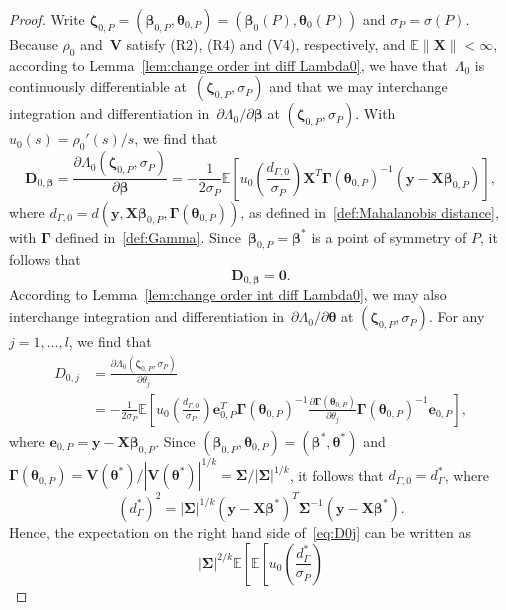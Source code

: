 \documentclass{article}
\numberwithin{equation}{section}
\theoremstyle{plain}
\newcommand{\bbeta}{\bm\beta}
\newcommand{\btheta}{\bm\theta}
\newcommand{\bSigma}{\mathbf{\Sigma}}
\newcommand{\bGamma}{\bm\Gamma}
\newcommand{\bzeta}{\bm\zeta}
\newcommand{\by}{\mathbf{y}}
\newcommand{\be}{\mathbf{e}}
\newcommand{\bX}{\mathbf{X}}
\newcommand{\bV}{\mathbf{V}}
\newcommand{\bD}{\mathbf{D}}
\newcommand{\E}{\mathbb{E}}
\begin{document}
\begin{proof}
Write $\bzeta_{0,P}=(\bbeta_{0,P},\btheta_{0,P})=(\bbeta_0(P),\btheta_0(P))$ and $\sigma_P=\sigma(P)$.
Because $\rho_0$ and~$\bV$ satisfy (R2), (R4) and (V4), respectively, and $\E\|\bX\|<\infty$,
according to Lemma~\ref{lem:change order int diff Lambda0},
we have that~$\Lambda_0$ is continuously differentiable at~$(\bzeta_{0,P},\sigma_P)$
and that we may interchange integration and differentiation in~$\partial\Lambda_0/\partial\bbeta$
at $(\bzeta_{0,P},\sigma_P)$.
With~$u_0(s)=\rho_0'(s)/s$, we find that
\[
\bD_{0,\bbeta}
=
\frac{\partial\Lambda_0(\bzeta_{0,P},\sigma_P)}{\partial\bbeta}
=
-
\frac{1}{2\sigma_P}
\E
\left[
u_0\left(
\frac{d_{\Gamma,0}}{\sigma_P}
\right)
\bX^T\bGamma(\btheta_{0,P})^{-1}(\by-\bX\bbeta_{0,P})
\right],
\]
where $d_{\Gamma,0}=d(\by,\bX\bbeta_{0,P},\bGamma(\btheta_{0,P}))$,
as defined in~\eqref{def:Mahalanobis distance},
with $\bGamma$ defined in~\eqref{def:Gamma}.
Since~$\bbeta_{0,P}=\bbeta^*$ is a point of symmetry of $P$, it follows that
\begin{equation}
\label{eq:D0beta=0}
\bD_{0,\bbeta}=\mathbf{0}.
\end{equation}
According to Lemma~\ref{lem:change order int diff Lambda0},
we may also interchange integration and differentiation in~$\partial\Lambda_0/\partial\btheta$
at $(\bzeta_{0,P},\sigma_P)$.
For any $j=1,\ldots,l$,
we find that
\begin{equation}
\label{eq:D0j}
\begin{split}
D_{0,j}
&=
\frac{\partial\Lambda_0(\bzeta_{0,P},\sigma_P)}{\partial\theta_{j}}\\
&=
-
\frac{1}{2\sigma_P}
\E\left[
u_0\left(\frac{d_{\Gamma,0}}{\sigma_P}\right)
\be_{0,P}^T\bGamma(\btheta_{0,P})^{-1}
\frac{\partial \bGamma(\btheta_{0,P})}{\partial \theta_{j}}
\bGamma(\btheta_{0,P})^{-1}
\be_{0,P}
\right],
\end{split}
\end{equation}
where $\be_{0,P}=\by-\bX\bbeta_{0,P}$.
Since $(\bbeta_{0,P},\btheta_{0,P})=(\bbeta^*,\btheta^*)$ and 
$\bGamma(\btheta_{0,P})=\bV(\btheta^*)/|\bV(\btheta^*)|^{1/k}=\bSigma/|\bSigma|^{1/k}$,
it follows that $d_{\Gamma,0}=d_{\Gamma}^*$, where
\begin{equation}
\label{eq:dGamma*}
(d_{\Gamma}^*)^2
=
|\bSigma|^{1/k}
(\by-\bX\bbeta^*)^T
\bSigma^{-1}
(\by-\bX\bbeta^*).
\end{equation}
Hence, the expectation on the right hand side of~\eqref{eq:D0j} can be written as
\[
|\bSigma|^{2/k}
\E\left[
\E\left[
u_0\left(\frac{d_{\Gamma}^*}{\sigma_P}\right)
\]
\end{proof}
\end{document}
